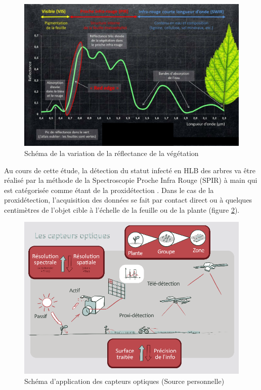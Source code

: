 \documentclass[
  11pt,
  french,
  a4paper,
  extrafontsizes,onecolumn,openright
  ]{memoir}
\begin{document}
\begin{figure}

{\centering \includegraphics[width=0.8\linewidth]{Images/Figure7} 

}

\caption{Schéma de la variation de la réflectance de la végétation}\label{fig:7}
\end{figure}

\normalsize

Au cours de cette étude, la détection du statut infecté en HLB des arbres va être réalisé par la méthode de la Spectroscopie Proche Infra Rouge (SPIR) à main qui est catégorisée comme étant de la proxidétection \autocite{albetis_de_la_cruz_potentiel_2018}.
Dans le cas de la proxidétection, l'acquisition des données se fait par contact direct ou à quelques centimètres de l'objet cible à l'échelle de la feuille ou de la plante (figure \ref{fig:8}).

\scriptsize

\begin{figure}

{\centering \includegraphics[width=0.8\linewidth]{Images/Figure8} 

}

\caption{Schéma d’application des capteurs optiques (Source personnelle)}\label{fig:8}
\end{figure}
\end{document}
